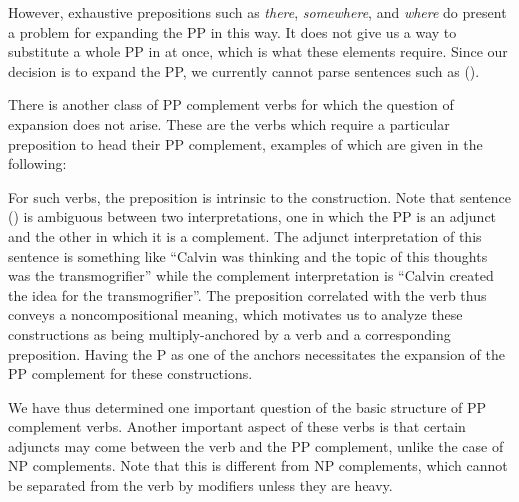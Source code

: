 However, exhaustive prepositions such as {\it there}, {\it somewhere},
and {\it where} do present a problem for expanding the PP in this way.
It does not give us a way to substitute a whole PP in at once, which
is what these elements require.  Since our decision is to expand the
PP, we currently cannot parse sentences such as ().


There is another class of PP complement verbs for which the question
of expansion does not arise.  These are the verbs which require a
particular preposition to head their PP complement, examples of which
are given in the following:


\noindent
For such verbs, the preposition is intrinsic to the construction.
Note that sentence () is ambiguous between two interpretations,
one in which the PP is an adjunct and the other in which it is a
complement.  The adjunct interpretation of this sentence is something
like ``Calvin was thinking and the topic of this thoughts was the
transmogrifier'' while the complement interpretation is ``Calvin
created the idea for the transmogrifier''.  The preposition correlated
with the verb thus conveys a noncompositional meaning, which motivates
us to analyze these constructions as being multiply-anchored by a verb
and a corresponding preposition.  Having the P as one of the anchors
necessitates the expansion of the PP complement for these
constructions.

We have thus determined one important question of the basic structure
of PP complement verbs.  Another important aspect of these verbs is
that certain adjuncts may come between the verb and the PP complement,
unlike the case of NP complements.  Note that this is different from
NP complements, which cannot be separated from the verb by modifiers
unless they are heavy.


